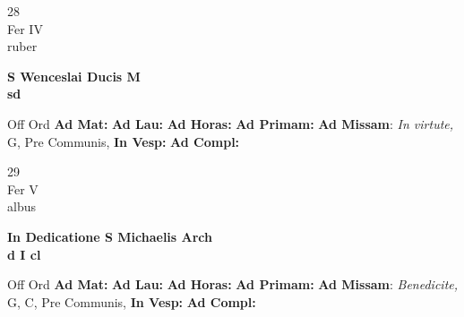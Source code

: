 \documentclass[10pt, openany]{book}
\begin{document}
        \begin{center}
            \begin{minipage}{3.5in}
                \vspace{2em}
                \begin{minipage}{0.5in}
                    {\Huge 28} \\
                    {\normalsize Fer IV} \\
                    {\normalsize ruber}
                \end{minipage}
                \begin{minipage}{3.0in}
                    \textbf{ \large S Wenceslai Ducis M \\
                    \textnormal{\normalsize sd}} \\ 
                \end{minipage}
                \begin{justify}Off Ord
                    \textbf{Ad Mat: }
                    \textbf{Ad Lau: }
                    \textbf{Ad Horas: }
                    \textbf{Ad Primam: }\textbf{Ad Missam}: \textit{In virtute,} G, Pre Communis,  
                    \textbf{In Vesp: }
                    \textbf{Ad Compl: }
                \end{justify}
            \end{minipage}
        \end{center}
    
        \begin{center}
            \begin{minipage}{3.5in}
                \vspace{2em}
                \begin{minipage}{0.5in}
                    {\Huge 29} \\
                    {\normalsize Fer V} \\
                    {\normalsize albus}
                \end{minipage}
                \begin{minipage}{3.0in}
                    \textbf{ \large In Dedicatione S Michaelis Arch \\
                    \textnormal{\normalsize d I cl}} \\ 
                \end{minipage}
                \begin{justify}Off Ord
                    \textbf{Ad Mat: }
                    \textbf{Ad Lau: }
                    \textbf{Ad Horas: }
                    \textbf{Ad Primam: }\textbf{Ad Missam}: \textit{Benedicite,} G, C, Pre Communis,  
                    \textbf{In Vesp: }
                    \textbf{Ad Compl: }
                \end{justify}
            \end{minipage}
        \end{center}
    
\end{document}

